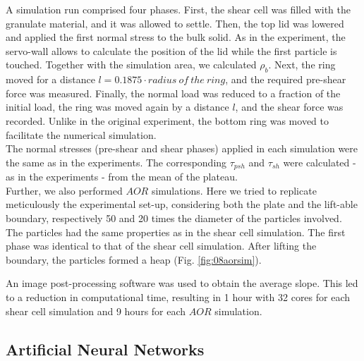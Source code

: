A simulation run comprised four phases. 
First, the shear cell was filled with the granulate material, and it was allowed to settle. 
Then, the top lid was lowered and applied the first normal stress to the bulk solid. 
As in the experiment, the servo-wall allows to calculate the position of the lid while the first particle is touched. Together with the simulation area, we calculated $\rho_b$.
Next, the ring moved for a distance $l=0.1875 \cdot radius ~of ~the ~ring$, and the required pre-shear force was measured. 
Finally, the normal load was reduced to a fraction of the initial load, the ring was moved again by a distance $l$, and the shear force was recorded. 
Unlike in the original experiment, the bottom ring was moved to facilitate the numerical simulation.\\
The normal stresses (pre-shear and shear phases) applied in each simulation were
the same as in the experiments. The corresponding $\tau_{psh}$ and $\tau_{sh}$
were calculated - as in the experiments - from the mean of the plateau.\\

Further, we also performed $AOR$ simulations. Here we tried to replicate meticulously the experimental set-up, considering both the plate and the lift-able boundary, 
respectively 50 and 20 times the diameter of the particles involved.
The particles had the same properties as in the shear cell simulation.
The first phase was identical to that of the shear cell simulation. 
After lifting the boundary, the particles formed a heap (Fig. \ref{fig:08aorsim}). 

An image post-processing software was used to obtain the average slope.
This led to a reduction in computational time, resulting in 1 hour with 32 cores
for each shear cell simulation and 9 hours for each $AOR$ simulation.\\

\subsection{Artificial Neural Networks}
\label{subsec:ann}

